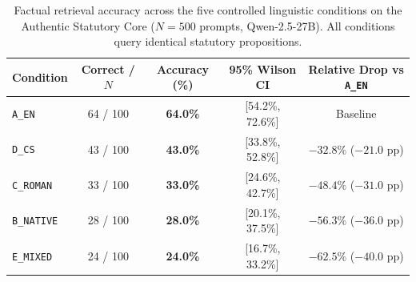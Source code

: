 \begin{table}[t]
\centering
\small
\begin{tabular}{lcccc}
\toprule
\textbf{Condition} & \textbf{Correct / $N$} & \textbf{Accuracy (\%)} & \textbf{95\% Wilson CI} & \textbf{Relative Drop vs \texttt{A\_EN}} \\
\midrule
\texttt{A\_EN} & 64 / 100 & \textbf{64.0\%} & [54.2\%, 72.6\%] & Baseline \\
\texttt{D\_CS} & 43 / 100 & \textbf{43.0\%} & [33.8\%, 52.8\%] & $-32.8\%$ ($-21.0$ pp) \\
\texttt{C\_ROMAN} & 33 / 100 & \textbf{33.0\%} & [24.6\%, 42.7\%] & $-48.4\%$ ($-31.0$ pp) \\
\texttt{B\_NATIVE} & 28 / 100 & \textbf{28.0\%} & [20.1\%, 37.5\%] & $-56.3\%$ ($-36.0$ pp) \\
\texttt{E\_MIXED} & 24 / 100 & \textbf{24.0\%} & [16.7\%, 33.2\%] & $-62.5\%$ ($-40.0$ pp) \\
\bottomrule
\end{tabular}
\caption{Factual retrieval accuracy across the five controlled linguistic conditions on the Authentic Statutory Core ($N=500$ prompts, Qwen-2.5-27B). All conditions query identical statutory propositions.}
\label{tab:accuracy_by_condition}
\end{table}
